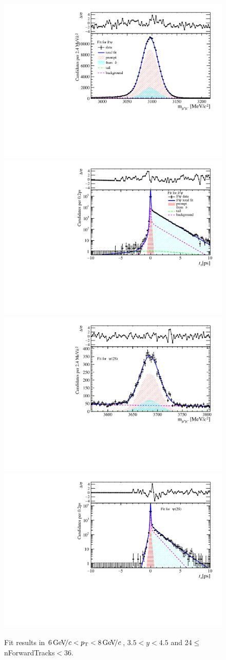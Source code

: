 \begin{figure}[H]
\begin{center}
\includegraphics[width=0.47\linewidth]{pdf/Jpsi/drawmassF/n3y3pt4.pdf}
\includegraphics[width=0.47\linewidth]{pdf/Jpsi/2DFitF/n3y3pt4.pdf}
\vspace*{-0.5cm}
\includegraphics[width=0.47\linewidth]{pdf/Psi2S/drawmassF/n3y3pt4.pdf}
\includegraphics[width=0.47\linewidth]{pdf/Psi2S/2DFitF/n3y3pt4.pdf}
\vspace*{-0.5cm}
\end{center}
\caption{Fit results in $6\text{\,Ge\kern -0.1em V\!/}c<p_{\mathrm{T}}<8\text{\,Ge\kern -0.1em V\!/}c$, $3.5<y<4.5$ and 24$\leq$nForwardTracks$<$36.}
\label{Fitn3y3pt4}
\end{figure}
